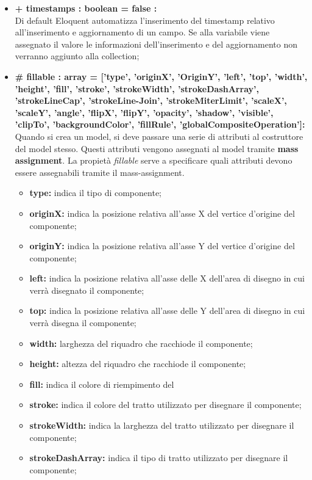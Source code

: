 	\begin{itemize}
		\item \textbf{+ timestamps : boolean = false :}\\
		Di default Eloquent automatizza l'inserimento del timestamp relativo all'inserimento e aggiornamento di un campo. Se alla variabile viene assegnato il valore le informazioni dell'inserimento e del aggiornamento non verranno aggiunto alla collection;
		\item \textbf{\# fillable : array = [’type’, ’originX’, ’OriginY’, ’left’, ’top’, ’width’, ’height’, ’fill’, ’stroke’, ’strokeWidth’, ’strokeDashArray’, ’strokeLineCap’, ’strokeLine-Join’, ’strokeMiterLimit’, ’scaleX’, ’scaleY’, ’angle’, ’flipX’, ’flipY’, ’opacity’, ’shadow’, ’visible’, ’clipTo’, ’backgroundColor’, ’fillRule’, ’globalCompositeOperation']:}\\
		Quando si crea un model, si deve passare una serie di attributi al costruttore del model stesso. Questi attributi vengono assegnati al model tramite \textbf{mass assignment}. La propietà \textit{fillable} serve a specificare quali attributi devono essere assegnabili tramite il mass-assignment.
		\begin{itemize}
			\item \textbf{type:} indica il tipo di componente;
			\item \textbf{originX:} indica la posizione relativa all'asse X del vertice d'origine del componente;
			\item \textbf{originY:} indica la posizione relativa all'asse Y del vertice d'origine del componente;
			\item \textbf{left:} indica la posizione relativa all'asse delle X dell'area di disegno in cui verrà disegnato il componente;
			\item \textbf{top:} indica la posizione relativa all'asse delle Y dell'area di disegno in cui verrà disegna il componente;
			\item \textbf{width:} larghezza del riquadro che racchiode il componente;
			\item \textbf{height:} altezza del riquadro che racchiode il componente;
			\item \textbf{fill:} indica il colore di riempimento del
			\item \textbf{stroke:} indica il colore del tratto utilizzato per disegnare il componente;
			\item \textbf{strokeWidth:} indica la larghezza del tratto utilizzato per disegnare il componente;
			\item \textbf{strokeDashArray:} indica il tipo di tratto utilizzato per disegnare il componente;

\end{itemize}
\end{itemize}
